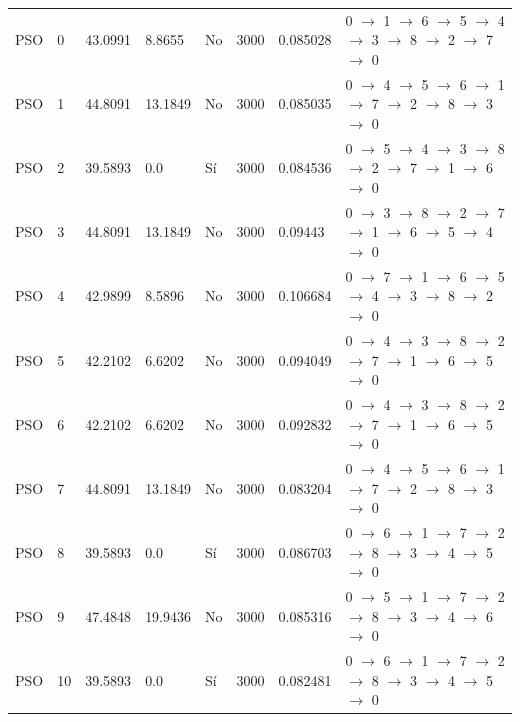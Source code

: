 \begin{table}[htbp]
\begin{tabular}{llllllll}
    PSO & 0 & 43.0991 & 8.8655 & No & 3000 & 0.085028 & 0 $\rightarrow$ 1 $\rightarrow$ 6 $\rightarrow$ 5 $\rightarrow$ 4 $\rightarrow$ 3 $\rightarrow$ 8 $\rightarrow$ 2 $\rightarrow$ 7 $\rightarrow$ 0 \\
    PSO & 1 & 44.8091 & 13.1849 & No & 3000 & 0.085035 & 0 $\rightarrow$ 4 $\rightarrow$ 5 $\rightarrow$ 6 $\rightarrow$ 1 $\rightarrow$ 7 $\rightarrow$ 2 $\rightarrow$ 8 $\rightarrow$ 3 $\rightarrow$ 0 \\
    PSO & 2 & 39.5893 & 0.0 & Sí & 3000 & 0.084536 & 0 $\rightarrow$ 5 $\rightarrow$ 4 $\rightarrow$ 3 $\rightarrow$ 8 $\rightarrow$ 2 $\rightarrow$ 7 $\rightarrow$ 1 $\rightarrow$ 6 $\rightarrow$ 0 \\
    PSO & 3 & 44.8091 & 13.1849 & No & 3000 & 0.09443 & 0 $\rightarrow$ 3 $\rightarrow$ 8 $\rightarrow$ 2 $\rightarrow$ 7 $\rightarrow$ 1 $\rightarrow$ 6 $\rightarrow$ 5 $\rightarrow$ 4 $\rightarrow$ 0 \\
    PSO & 4 & 42.9899 & 8.5896 & No & 3000 & 0.106684 & 0 $\rightarrow$ 7 $\rightarrow$ 1 $\rightarrow$ 6 $\rightarrow$ 5 $\rightarrow$ 4 $\rightarrow$ 3 $\rightarrow$ 8 $\rightarrow$ 2 $\rightarrow$ 0 \\
    PSO & 5 & 42.2102 & 6.6202 & No & 3000 & 0.094049 & 0 $\rightarrow$ 4 $\rightarrow$ 3 $\rightarrow$ 8 $\rightarrow$ 2 $\rightarrow$ 7 $\rightarrow$ 1 $\rightarrow$ 6 $\rightarrow$ 5 $\rightarrow$ 0 \\
    PSO & 6 & 42.2102 & 6.6202 & No & 3000 & 0.092832 & 0 $\rightarrow$ 4 $\rightarrow$ 3 $\rightarrow$ 8 $\rightarrow$ 2 $\rightarrow$ 7 $\rightarrow$ 1 $\rightarrow$ 6 $\rightarrow$ 5 $\rightarrow$ 0 \\
    PSO & 7 & 44.8091 & 13.1849 & No & 3000 & 0.083204 & 0 $\rightarrow$ 4 $\rightarrow$ 5 $\rightarrow$ 6 $\rightarrow$ 1 $\rightarrow$ 7 $\rightarrow$ 2 $\rightarrow$ 8 $\rightarrow$ 3 $\rightarrow$ 0 \\
    PSO & 8 & 39.5893 & 0.0 & Sí & 3000 & 0.086703 & 0 $\rightarrow$ 6 $\rightarrow$ 1 $\rightarrow$ 7 $\rightarrow$ 2 $\rightarrow$ 8 $\rightarrow$ 3 $\rightarrow$ 4 $\rightarrow$ 5 $\rightarrow$ 0 \\
    PSO & 9 & 47.4848 & 19.9436 & No & 3000 & 0.085316 & 0 $\rightarrow$ 5 $\rightarrow$ 1 $\rightarrow$ 7 $\rightarrow$ 2 $\rightarrow$ 8 $\rightarrow$ 3 $\rightarrow$ 4 $\rightarrow$ 6 $\rightarrow$ 0 \\
    PSO & 10 & 39.5893 & 0.0 & Sí & 3000 & 0.082481 & 0 $\rightarrow$ 6 $\rightarrow$ 1 $\rightarrow$ 7 $\rightarrow$ 2 $\rightarrow$ 8 $\rightarrow$ 3 $\rightarrow$ 4 $\rightarrow$ 5 $\rightarrow$ 0 \\

\end{tabular}
\end{table}
